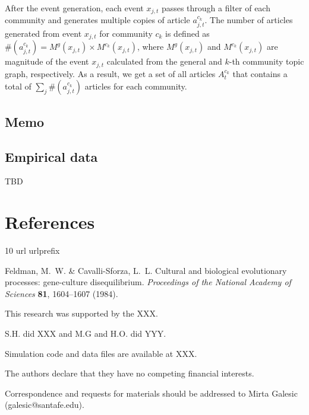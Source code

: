 \documentclass{nature}
\begin{document}
\begin{methods}
After the event generation, each event $x_{j, t}$ passes through a filter of each community and generates multiple copies of article $a_{j, t}^{c_k}$. The number of articles generated from event $x_{j, t}$ for community $c_k$ is defined as $\#(a_{j, t}^{c_k}) = M^g(x_{j, t}) \times M^{c_k}(x_{j, t})$, where $M^g(x_{j, t})$ and $M^{c_k}(x_{j, t})$ are magnitude of the event $x_{j, t}$ calculated from the general and $k$-th community topic graph, respectively. As a result, we get a set of all articles $A_{t}^{c_k}$ that contains a total of  $\sum_j \#(a_{j, t}^{c_k})$ articles for each community.


\subsection{Memo}


\subsection{Empirical data}
TBD


\end{methods}



\section{References}

\begin{thebibliography}{10}
  \expandafter\ifx\csname url\endcsname\relax
    \def\url#1{\texttt{#1}}\fi
  \expandafter\ifx\csname urlprefix\endcsname\relax\def\urlprefix{URL }\fi
  \providecommand{\bibinfo}[2]{#2}
  \providecommand{\eprint}[2][]{\url{#2}}
  
  \bibinfo{author}{Feldman, M.~W.} \& \bibinfo{author}{Cavalli-Sforza, L.~L.}
  \newblock \bibinfo{title}{Cultural and biological evolutionary processes:
    gene-culture disequilibrium}.
  \newblock \emph{\bibinfo{journal}{Proceedings of the National Academy of
    Sciences}} \textbf{\bibinfo{volume}{81}}, \bibinfo{pages}{1604--1607}
    (\bibinfo{year}{1984}).
  
  \end{thebibliography}
  

\begin{addendum}
 \item This research was supported by the XXX.
 \item[Author contribution] S.H. did XXX and M.G and H.O. did YYY.
 \item[Code availability] Simulation code and data files are available at XXX.
 \item[Competing Interests] The authors declare that they have no competing financial interests.
 \item[Correspondence] Correspondence and requests for materials should be addressed to Mirta Galesic (galesic@santafe.edu).
\end{addendum}
\end{document}
